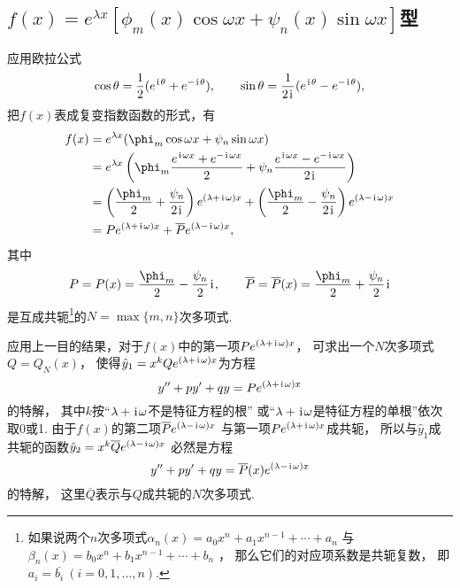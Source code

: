 \subsection{\texorpdfstring{\(f(x) = e^{\lambda x} [ \phi_m(x) \cos\omega x + \psi_n(x) \sin \omega x ]\)型}{第二类：指数函数与广义三角函数的乘积}}
应用欧拉公式\begin{equation*}
	\cos\theta = \frac{1}{2}(e^{\kern1pt\mathrm{i}\kern1pt\theta}+e^{-\kern1pt\mathrm{i}\kern1pt\theta}),
	\qquad
	\sin\theta = \frac{1}{2\kern1pt\mathrm{i}\kern1pt}(e^{\kern1pt\mathrm{i}\kern1pt\theta}-e^{-\kern1pt\mathrm{i}\kern1pt\theta}),
\end{equation*}
把\(f(x)\)表成复变指数函数的形式，有\begin{align*}
	f(x) &= e^{\lambda x} ( \phi_m \cos \omega x + \psi_n \sin \omega x ) \\
	&= e^{\lambda x} \left(
	\phi_m \frac{e^{\iu\omega x}+e^{-\iu\omega x}}{2}
	+ \psi_n \frac{e^{\iu\omega x}-e^{-\iu\omega x}}{2\iu}
	\right) \\
	&= \left(\frac{\phi_m}{2}+\frac{\psi_n}{2\iu}\right) e^{(\lambda+\iu\omega)x}
	+ \left(\frac{\phi_m}{2}-\frac{\psi_n}{2\iu}\right) e^{(\lambda-\iu\omega)x} \\
	&= P e^{(\lambda+\iu\omega)x}
	+ \overline{P} e^{(\lambda-\iu\omega)x},
\end{align*}
其中\begin{equation*}
	P = P(x) = \frac{\phi_m}{2} - \frac{\psi_n}{2}\iu,
	\qquad
	\overline{P} = \overline{P}(x) = \frac{\phi_m}{2}+\frac{\psi_n}{2}\iu
\end{equation*}是互成共轭\footnote{%
如果说两个\(n\)次多项式\(\alpha_n(x) = a_0 x^n + a_1 x^{n-1} + \dotsb + a_n\)
与\(\beta_n(x) = b_0 x^n + b_1 x^{n-1} + \dotsb + b_n\) ，
那么它们的对应项系数是共轭复数，
即\(a_i = \overline{b_i}\ (i=0,1,\dotsc,n)\).}的\(N = \max\{m,n\}\)次多项式.

应用上一目的结果，对于\(f(x)\)中的第一项\(P e^{(\lambda+\kern1pt\mathrm{i}\kern1pt\omega)x}\)，
可求出一个\(N\)次多项式\(Q = Q_N(x)\)，
使得\(\hat{y}_1 = x^k Q e^{(\lambda+\kern1pt\mathrm{i}\kern1pt\omega)x}\)为方程\begin{equation*}
	y'' + p y' + q y = P e^{(\lambda+\kern1pt\mathrm{i}\kern1pt\omega)x}
\end{equation*}的特解，
其中\(k\)按“\(\lambda+\kern1pt\mathrm{i}\kern1pt\omega\)不是特征方程的根”
或“\(\lambda+\kern1pt\mathrm{i}\kern1pt\omega\)是特征方程的单根”依次取0或1.
由于\(f(x)\)的第二项\(\overline{P} e^{(\lambda-\kern1pt\mathrm{i}\kern1pt\omega)x}\)
与第一项\(P e^{(\lambda+\kern1pt\mathrm{i}\kern1pt\omega)x}\)成共轭，
所以与\(\hat{y}_1\)成共轭的函数\(\hat{y}_2 = x^k \overline{Q} e^{(\lambda-\kern1pt\mathrm{i}\kern1pt\omega)x}\)
必然是方程\begin{equation*}
	y'' + p y' + q y = \overline{P}(x) e^{(\lambda-\kern1pt\mathrm{i}\kern1pt\omega)x}
\end{equation*}的特解，
这里\(\overline{Q}\)表示与\(Q\)成共轭的\(N\)次多项式.

